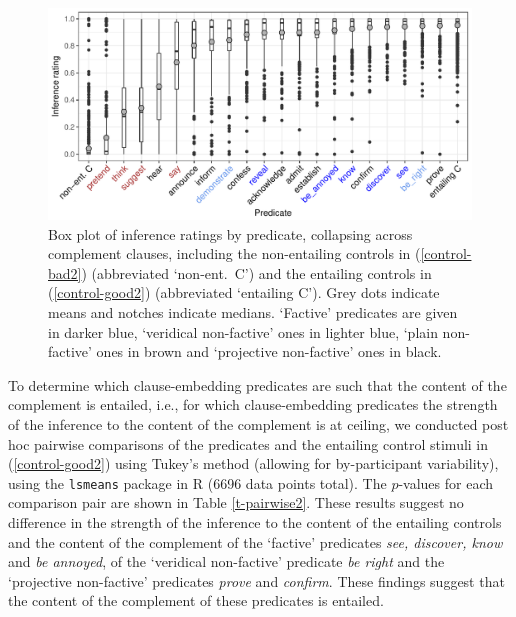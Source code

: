 \documentclass[11pt,fleqn]{article}
\newcommand{\6}{\mbox{$[\hspace*{-.6mm}[$}}
\newcommand{\9}{\mbox{$]\hspace*{-.6mm}]$}}
\begin{document}
\begin{figure}[h!]
\centering

\includegraphics[width=.75\paperwidth]{../results/4-veridicality3/graphs/boxplot-inference}

\caption{Box plot of inference ratings by predicate, collapsing across complement clauses, including the non-entailing controls in (\ref{control-bad2}) (abbreviated `non-ent.\ C') and the entailing controls in (\ref{control-good2}) (abbreviated `entailing C'). Grey dots indicate means and notches indicate medians. `Factive' predicates are given in darker blue, `veridical non-factive' ones in lighter blue, `plain non-factive' ones in brown and `projective non-factive' ones in black.}
\label{f-veridicality-predicate2}
\end{figure}

To determine which clause-embedding predicates are such that the content of the complement is entailed, i.e., for which clause-embedding predicates the strength of the inference to the content of the complement is at ceiling, we conducted post hoc pairwise comparisons of the predicates and the entailing control stimuli in (\ref{control-good2}) using Tukey's method (allowing for by-participant variability), using the \verb|lsmeans| package \citep{tukey} in R \citep{r}  (6696 data points total). The $p$-values for each comparison pair are shown in Table  \ref{t-pairwise2}. These results suggest no difference in the strength of the inference to the content of the entailing controls and the content of the complement of the `factive' predicates {\em see, discover, know} and {\em be annoyed}, of the `veridical non-factive' predicate {\em be right} and the `projective non-factive' predicates {\em prove} and {\em confirm}. These findings suggest that the content of the complement of these predicates is entailed.
\end{document}
